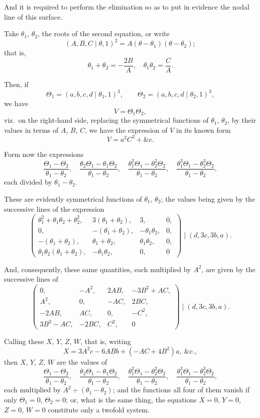 \documentclass[11pt,a4paper]{book}
\begin{document}
And it is required to perform the elimination so as to put in evidence
the nodal line of this surface.

Take $\theta_1$, $\theta_2$, the roots of the second equation, or write
\[
(A,B,C\mid\theta,1)^2 = A(\theta-\theta_1)(\theta-\theta_2);
\]
that is,
\[
\theta_1+\theta_2 = -\frac{2B}{A},\quad \theta_1\theta_2 = \frac{C}{A}.
\]

Then, if
\[
\Theta_1 = (a,b,c,d\mid\theta_1,1)^3,\qquad
\Theta_2 = (a,b,c,d\mid\theta_2,1)^3,
\]
we have
\[
V = \Theta_1\Theta_2,
\]
viz.~on the right-hand side, replacing the symmetrical functions of
$\theta_1$, $\theta_2$, by their values in terms of $A$, $B$, $C$, we have the
expression of $V$ in its known form
\[
V = a^2C^3 + \&\text{c.}
\]

Form now the expressions
\[
\frac{\Theta_1-\Theta_2}{\theta_1-\theta_2},\quad
\frac{\theta_2\Theta_1-\theta_1\Theta_2}{\theta_1-\theta_2},\quad
\frac{\theta_1^2\Theta_1-\theta_2^2\Theta_2}{\theta_1-\theta_2},\quad
\frac{\theta_1^3\Theta_1-\theta_2^3\Theta_2}{\theta_1-\theta_2},
\]
each divided by $\theta_1-\theta_2$.

These are evidently symmetrical functions of $\theta_1$, $\theta_2$; the values
being given by the successive lines of the expression
\[
\begin{pmatrix}
\theta_1^2+\theta_1\theta_2+\theta_2^2, & 3(\theta_1+\theta_2), & 3, & 0,\\
0, & -(\theta_1+\theta_2), & -\theta_1\theta_2, & 0,\\
-(\theta_1+\theta_2), & \theta_1+\theta_2, & \theta_1\theta_2, & 0,\\
\theta_1\theta_2(\theta_1+\theta_2), & -\theta_1\theta_2, & 0, & 0
\end{pmatrix}
\mid
(d, 3c, 3b, a).
\]

And, consequently, these same quantities, each multiplied by $A^2$, are
given by the successive lines of
\[
\begin{pmatrix}
0, & -A^2, & 2AB, & -3B^2+AC,\\
A^2, & 0, & -AC, & 2BC,\\
-2AB, & AC, & 0, & -C^2,\\
3B^2-AC, & -2BC, & C^2, & 0
\end{pmatrix}
\mid
(d, 3c, 3b, a).
\]

Calling these $X$, $Y$, $Z$, $W$, that is, writing
\[
X = 3A^2c - 6ABb + (-AC + 4B^2)a,\ \&\text{c.},
\]
then $X$, $Y$, $Z$, $W$ are the values of
\[
\frac{\Theta_1-\Theta_2}{\theta_1-\theta_2},\quad
\frac{\theta_2\Theta_1-\theta_1\Theta_2}{\theta_1-\theta_2},\quad
\frac{\theta_1^2\Theta_1-\theta_2^2\Theta_2}{\theta_1-\theta_2},\quad
\frac{\theta_1^3\Theta_1-\theta_2^3\Theta_2}{\theta_1-\theta_2},
\]
each multiplied by $A^2\div(\theta_1-\theta_2)$; and the functions all four of them
vanish if only $\Theta_1=0$, $\Theta_2=0$; or, what is the same thing, the
equations $X=0$, $Y=0$, $Z=0$, $W=0$ constitute only a twofold system.
\end{document}
